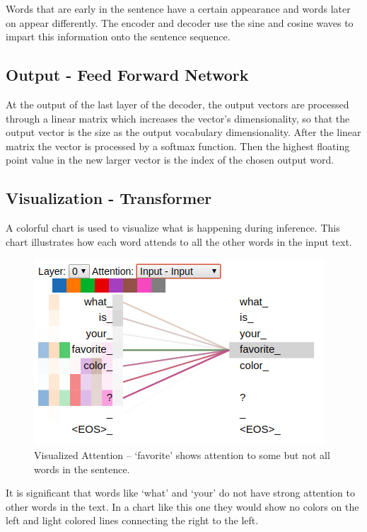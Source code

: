 Words that are early in the sentence have a certain appearance and words later on appear differently. The encoder and decoder use the sine and cosine waves to impart this information onto the sentence sequence. 

\subsection{Output - Feed Forward Network}
At the output of the last layer of the decoder, the output vectors are processed through a linear matrix which increases the vector's dimensionality, so that the output vector is the size as the output vocabulary dimensionality. After the linear matrix the vector is processed by a softmax function. Then the highest floating point value in the new larger vector is the index of the chosen output word.


\subsection{Visualization - Transformer}

A colorful chart is used to visualize what is happening during inference. This chart illustrates how each word attends to all the other words in the input text.

\begin{figure}[H]
	\begin{center}
		\includegraphics[scale=2]{Figure_3}
		
		
	\end{center}
	\caption[Visualized Attention Transformer]{Visualized Attention -- `favorite' shows attention to some but not all words in the sentence.}
	
	
\end{figure}

It is significant that words like `what' and `your' do not have strong attention to other words in the text. In a chart like this one they would show no colors on the left and light colored lines connecting the right to the left.


